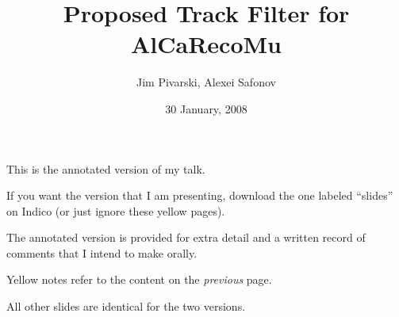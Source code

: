 \documentclass[compress]{beamer}
\title{Proposed Track Filter for AlCaRecoMu}
\author{Jim Pivarski, Alexei Safonov}
\institute{Texas A\&M University}
\date{30 January, 2008}
\begin{document}

\begin{notes}
\item This is the annotated version of my talk.
\item If you want the version that I am presenting, download the one
labeled ``slides'' on Indico (or just ignore these yellow pages).
\item The annotated version is provided for extra detail and a written
record of comments that I intend to make orally.
\item Yellow notes refer to the content on the {\it previous} page.
\item All other slides are identical for the two versions.
\end{notes}







\end{document}
